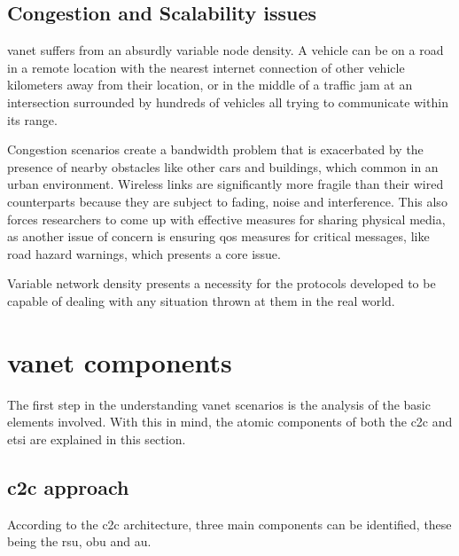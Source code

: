 \subsection{Congestion and Scalability issues}
\label{subsec:congestion_scalability}

\gls{vanet} suffers from an absurdly variable node density. A vehicle can be on a road in a remote location with the nearest internet connection of other vehicle kilometers away from their location, or in the middle of a traffic jam at an intersection surrounded by hundreds of vehicles all trying to communicate within its range.

Congestion scenarios create a bandwidth problem that is exacerbated by the presence of nearby obstacles like other cars and buildings, which common in an urban environment\cite{toor_vehicle_2008}. Wireless links are significantly more fragile than their wired counterparts because they are subject to fading, noise and interference\cite{corson_mobile_1999}. This also forces researchers to come up with effective measures for sharing physical media, as another issue of concern is ensuring \gls{qos} measures for critical messages, like road hazard warnings, which presents a core issue\cite{toor_vehicle_2008}.
 
Variable network density presents a necessity for the protocols developed to be capable of dealing with any situation thrown at them in the real world.


\section[VANET components]{\gls{vanet} components}
\label{sec:VANET_components}

The first step in the understanding \gls{vanet} scenarios is the analysis of the basic elements involved. With this in mind, the atomic components of both the \gls{c2c} and \gls{etsi} are explained in this section.

\subsection[C2C approach]{\gls{c2c} approach}
According to the \gls{c2c} architecture, three main components can be identified, these being the \gls{rsu}, \gls{obu} and \gls{au}.


